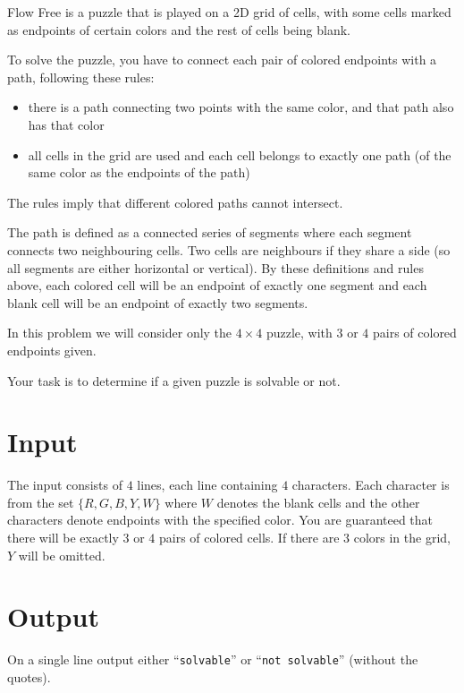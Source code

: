 

Flow Free is a puzzle that is played on a 2D grid of cells,
with some cells marked as endpoints of certain colors and the rest of cells being blank.

To solve the puzzle, you have to connect each pair of colored endpoints with a path, following these rules:

\begin{itemize}
\item there is a path connecting two points with the same color, and that path also has that color
\item all cells in the grid are used and each cell belongs to exactly one path (of the same color as the endpoints of the path)
\end{itemize}

The rules imply that different colored paths cannot intersect.

The path is defined as a connected series of segments where each segment connects two neighbouring cells.
Two cells are neighbours if they share a side (so all segments are either horizontal or vertical).
By these definitions and rules above, each colored cell will be an endpoint of exactly one segment and each blank cell will be an endpoint of exactly two segments.

In this problem we will consider only the $4 \times 4$ puzzle, with $3$ or $4$ pairs of colored endpoints given.

Your task is to determine if a given puzzle is solvable or not.

\section*{Input}

The input consists of $4$ lines, each line containing $4$ characters.  
Each character is from the set $\{R, G, B, Y, W\}$ where $W$ denotes the 
blank cells and the other characters denote endpoints with the specified 
color. You are guaranteed that there will be exactly $3$ or $4$ pairs 
of colored cells. If there are $3$ colors in the grid, $Y$ will be 
omitted.

\section*{Output}
On a single line output either ``\texttt{solvable}'' or ``\texttt{not solvable}'' (without the quotes).
